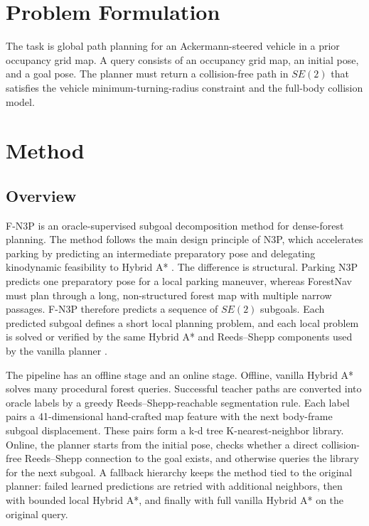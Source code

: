 \documentclass[11pt,a4paper]{article}
\begin{document}
\section{Problem Formulation}
\label{sec:problem}
The task is global path planning for an Ackermann-steered vehicle in a prior occupancy grid map. A query consists of an occupancy grid map, an initial pose, and a goal pose. The planner must return a collision-free path in $SE(2)$ that satisfies the vehicle minimum-turning-radius constraint and the full-body collision model.

\section{Method}
\label{sec:method}

\subsection{Overview}
\label{sec:method_overview}

F-N3P is an oracle-supervised subgoal decomposition method for dense-forest planning. The method follows the main design principle of N3P, which accelerates parking by predicting an intermediate preparatory pose and delegating kinodynamic feasibility to Hybrid A* \cite{Xue2026N3P}. The difference is structural. Parking N3P predicts one preparatory pose for a local parking maneuver, whereas ForestNav must plan through a long, non-structured forest map with multiple narrow passages. F-N3P therefore predicts a sequence of $SE(2)$ subgoals. Each predicted subgoal defines a short local planning problem, and each local problem is solved or verified by the same Hybrid A* and Reeds--Shepp components used by the vanilla planner \cite{Dolgov2010HybridAstar,ReedsShepp1990}.

The pipeline has an offline stage and an online stage. Offline, vanilla Hybrid A* solves many procedural forest queries. Successful teacher paths are converted into oracle labels by a greedy Reeds--Shepp-reachable segmentation rule. Each label pairs a 41-dimensional hand-crafted map feature with the next body-frame subgoal displacement. These pairs form a k-d tree K-nearest-neighbor library. Online, the planner starts from the initial pose, checks whether a direct collision-free Reeds--Shepp connection to the goal exists, and otherwise queries the library for the next subgoal. A fallback hierarchy keeps the method tied to the original planner: failed learned predictions are retried with additional neighbors, then with bounded local Hybrid A*, and finally with full vanilla Hybrid A* on the original query.
\end{document}
